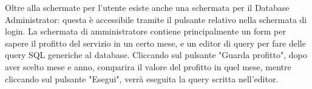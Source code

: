 \documentclass[a4paper,12pt]{report}
\begin{document}
Oltre alla schermate per l'utente esiste anche una schermata per il Database Administrator: questa è accessibile tramite il pulsante relativo nella schermata di login. La schermata di amministratore contiene principalmente un form per sapere il profitto del servizio in un certo mese, e un editor di query per fare delle query SQL generiche al database. Cliccando sul pulsante "Guarda profitto", dopo aver scelto mese e anno, comparira il valore del profitto in quel mese, mentre cliccando sul pulsante "Esegui", verrà eseguita la query scritta nell'editor.
\end{document}
